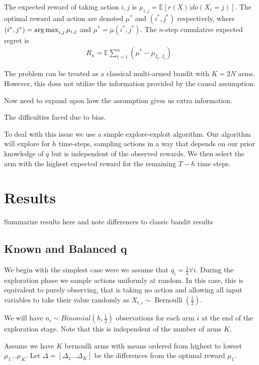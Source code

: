 \documentclass{article}
\newcommand{\E}{\mathbb E}
\newcommand{\argmax}{\operatornamewithlimits{arg\,max}}
\newcommand{\eq}[1]{\begin{align*}#1\end{align*}}
\newcommand{\Ber}{\operatorname{Bernoulli}}
\theoremstyle{plain}
\theoremstyle{definition}
\begin{document}
The expected reward of taking action $i,j$ is $\mu_{i,j} = \E[r(X)|do(X_i = j)]$. The optimal reward and action are denoted $\mu^*$ and $(i^*,j^*)$ respectively,
where $(i^*,j^*) = \argmax_{i,j} \mu_{i,j}$ and $\mu^* = \mu(i^*,j^*)$. The $n$-step cumulative expected regret is
\eq{
R_n = \E \sum_{t=1}^n \left(\mu^* - \mu_{I_t,J_t}\right).
}

The problem can be treated as a classical multi-armed bandit with $K = 2N$ arms. However, this does not utilize the information provided by the causal assumption. 

Now need to expand upon how the assumption gives us extra information. 

The difficulties faced due to bias.

To deal with this issue we use a simple explore-exploit algorithm. Our algorithm will explore for $h$ time-steps, sampling actions in a way that depends on our prior knowledge of $q$ but is independent of the observed rewards. We then select the arm with the highest expected reward for the remaining $T-h$ time steps. 



\section*{Results}

Summarize results here and note differences to classic bandit results

\subsection*{Known and Balanced q}

We begin with the simplest case were we assume that $q_i=\frac{1}{2} \forall i$. During the exploration phase we sample actions uniformly at random. In this case, this is equivalent to purely observing, that is taking no action and allowing all input variables to take their value randomly as  $X_{t,i} \sim \Ber(\frac{1}{2})$. 



We will have $n_i \sim Binomial(h,\frac{1}{2})$ observations for each arm $i$ at the end of the exploration stage. Note that this is independent of the number of arms $K$.



Assume we have $K$ bernoulli arms with means ordered from highest to lowest $\mu_1 ... \mu_K$. Let $\Delta = [\Delta_1...\Delta_K]$ be the differences from the optimal reward $\mu_1$. 
\end{document}
